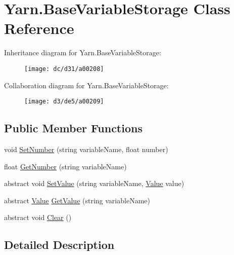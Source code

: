 \hypertarget{a00021}{\section{Yarn.\-Base\-Variable\-Storage Class Reference}
\label{a00021}
}


Inheritance diagram for Yarn.\-Base\-Variable\-Storage\-:
\nopagebreak
\begin{figure}[H]
\begin{center}
\leavevmode
\texttt{[image: dc/d31/a00208]}
\end{center}
\end{figure}


Collaboration diagram for Yarn.\-Base\-Variable\-Storage\-:
\nopagebreak
\begin{figure}[H]
\begin{center}
\leavevmode
\texttt{[image: d3/de5/a00209]}
\end{center}
\end{figure}
\subsection*{Public Member Functions}
\begin{DoxyCompactItemize}
\item 
void \hyperlink{a00021_a48b93de9cd7ae61d0cd9583c8330d3ee}{Set\-Number} (string variable\-Name, float number)
\item 
float \hyperlink{a00021_a1b7f7f4468b2463e7b47986d99362279}{Get\-Number} (string variable\-Name)
\item 
abstract void \hyperlink{a00021_a1c57d6d208b78abec0a670396771448e}{Set\-Value} (string variable\-Name, \hyperlink{a00086}{Value} value)
\item 
abstract \hyperlink{a00086}{Value} \hyperlink{a00021_a13b142df804d9842e97e628e252928e8}{Get\-Value} (string variable\-Name)
\item 
abstract void \hyperlink{a00021_a7e45c37f3662ce9f2643e306bb2b3adc}{Clear} ()
\end{DoxyCompactItemize}


\subsection{Detailed Description}


